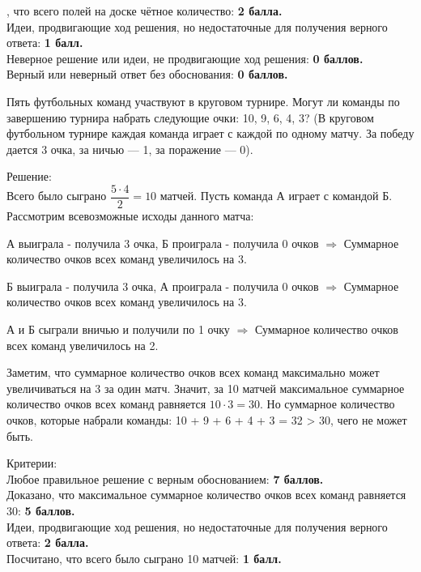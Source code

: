 \newpage

\hspace{3mm}

, что всего полей на доске чётное количество: \textbf{2 балла.}\\
Идеи, продвигающие ход решения, но недостаточные для получения верного ответа: \textbf{1 балл.}\\
Неверное решение или идеи, не продвигающие ход решения: \textbf{0 баллов.}\\
Верный или неверный ответ без обоснования: \textbf{0 баллов.}

\hspace{3mm}

Пять футбольных команд участвуют в круговом турнире. Могут ли команды по завершению турнира набрать следующие очки: 10, 9, 6, 4, 3? (В круговом футбольном турнире каждая команда играет с каждой по одному матчу. За победу дается 3 очка, за ничью — 1, за поражение — 0).

\hspace{3mm}

Решение:\\
Всего было сыграно $\dfrac{5\cdot4}{2} = 10$ матчей. Пусть команда А играет с командой Б. Рассмотрим всевозможные исходы данного матча:

А выиграла - получила 3 очка, Б проиграла - получила 0 очков $\Rightarrow$ Суммарное количество очков всех команд увеличилось на 3.

Б выиграла - получила 3 очка, А проиграла - получила 0 очков $\Rightarrow$ Суммарное количество очков всех команд увеличилось на 3.

А и Б сыграли вничью и получили по 1 очку $\Rightarrow$ Суммарное количество очков всех команд увеличилось на 2.

Заметим, что суммарное количество очков всех команд максимально может увеличиваться на 3 за один матч. Значит, за 10 матчей максимальное суммарное количество очков всех команд равняется $10\cdot3=30$. 
Но суммарное количество очков, которые набрали команды: 10 + 9 + 6 + 4 + 3 = 32 > 30, чего не может быть.

\hspace{3mm}

Критерии:\\
Любое правильное решение с верным обоснованием: \textbf{7 баллов.}\\
Доказано, что максимальное суммарное количество очков всех команд равняется 30: \textbf{5 баллов.}\\
Идеи, продвигающие ход решения, но недостаточные для получения верного ответа: \textbf{2 балла.}\\
Посчитано, что всего было сыграно 10 матчей: \textbf{1 балл.}\\

